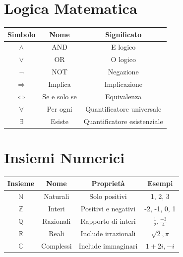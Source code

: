 \documentclass{book}
\begin{document}
\section{Logica Matematica}
\begin{center}
    \begin{tabular}{|c|c|c|}
        \hline
        \rowcolor{lightblue}
        Simbolo             & Nome         & Significato                 \\
        \hline
        \(\land\)           & AND          & E logico                    \\
        \(\lor\)            & OR           & O logico                    \\
        \(\neg\)            & NOT          & Negazione                   \\
        \(\Rightarrow\)     & Implica      & Implicazione                \\
        \(\Leftrightarrow\) & Se e solo se & Equivalenza                 \\
        $\forall$           & Per ogni     & Quantificatore universale   \\
        $\exists$           & Esiste       & Quantificatore esistenziale \\
        \hline
    \end{tabular}
\end{center}

\section{Insiemi Numerici}
\begin{center}
    \begin{tabular}{|c|c|c|c|}
        \hline
        \rowcolor{lightblue}
        Insieme        & Nome      & Proprietà           & Esempi                        \\
        \hline
        \(\mathbb{N}\) & Naturali  & Solo positivi       & 1, 2, 3                       \\
        \(\mathbb{Z}\) & Interi    & Positivi e negativi & -2, -1, 0, 1                  \\
        \(\mathbb{Q}\) & Razionali & Rapporto di interi  & \(\frac{1}{2}, \frac{-3}{4}\) \\
        \(\mathbb{R}\) & Reali     & Include irrazionali & \(\sqrt{2}, \pi\)             \\
        \(\mathbb{C}\) & Complessi & Include immaginari  & \(1 + 2i, -i\)                \\
        \hline
    \end{tabular}
\end{center}
\end{document}
